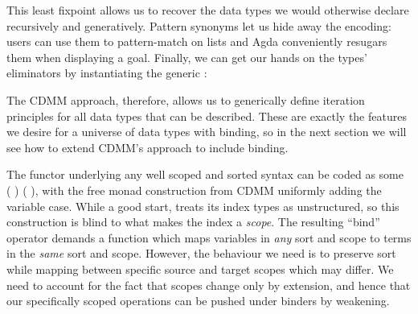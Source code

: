 \begin{center}
\end{center}

This least fixpoint allows us to recover the data types we would
otherwise declare recursively and generatively. Pattern synonyms let us hide away the
encoding: users can use them to pattern-match on lists and Agda
conveniently resugars them when displaying a goal. Finally, we can get
our hands on the types' eliminators by instantiating the generic
:

\begin{center}
\begin{minipage}[t]{0.45\textwidth}
\end{minipage}
\begin{minipage}[t]{0.45\textwidth}
\end{minipage}
\end{center}

The CDMM approach, therefore, allows us to generically define iteration principles
for all data types that can be described. These are exactly the features we desire
for a universe of data types with binding, so in the next section we will see how
to extend CDMM's approach to include binding.

The functor underlying any well scoped and sorted syntax can be coded as some
{ (   ) (   )},
 with the
free monad construction from CDMM uniformly adding the variable case. While a
good start,  treats its index types as unstructured, so this construction
is blind to what makes the { } index a \emph{scope}.
The resulting
``bind'' operator demands a function which maps variables in \emph{any} sort and
scope to terms in the \emph{same} sort and scope. However, the behaviour we need
is to preserve sort while mapping between specific source and target scopes which
may differ. We need to account for the fact that scopes change only by extension,
and hence that our specifically scoped operations can be pushed under binders by
weakening.




